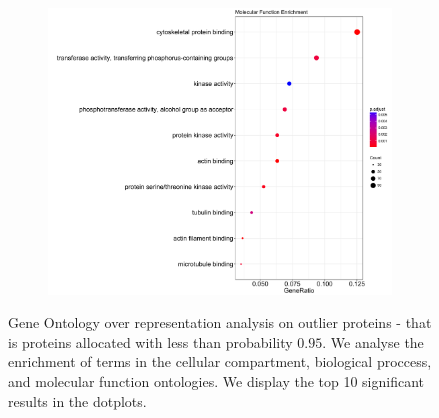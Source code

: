 \documentclass[12pt,english]{article}\usepackage[]{graphicx}\usepackage[]{color}
\begin{document}
\begin{figure}[h]
\begin{subfigure}[t]{0.5\textwidth}
\centering
\includegraphics[width=\textwidth]{MFenrich.pdf}
        \caption{}
\end{subfigure}
  \caption{Gene Ontology over representation analysis on outlier proteins - that is proteins
  allocated with less than probability $0.95$. We analyse the enrichment of terms
  in the cellular compartment, biological proccess, and molecular function ontologies. We display the top
  10 significant results in the dotplots.}
\label{fig:GOenrich}
\end{figure}




\clearpage



\end{document}

